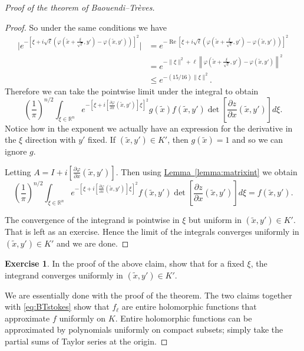 \documentclass[12pt,openany]{book}
\renewcommand{\Re}{\operatorname{Re}}
\newcommand{\snorm}[1]{\lVert {#1} \rVert}
\newcommand{\bbabs}[1]{\biggl\lvert {#1} \biggr\rvert}
\newcommand{\norm}[1]{\left\lVert {#1} \right\rVert}
\newcommand{\R}{{\mathbb{R}}}
\theoremstyle{plain}
\theoremstyle{remark}
\theoremstyle{definition}
\newenvironment{exbox}{%
    \def\FrameCommand{\vrule width 1pt \relax\hspace {10pt}}%
    \MakeFramed {\advance \hsize -\width \FrameRestore }%
}{%
    \endMakeFramed
}
\theoremstyle{exercise}
\newtheorem{exercise}{Exercise}[section]
\theoremstyle{example}
\newcommand{\lemmaref}[1]{\hyperref[#1]{Lemma~\ref*{#1}}}
\begin{document}
\begin{proof}[Proof of the theorem of Baouendi--Tr{\`e}ves]
\begin{proof}
So under the same conditions we have
\begin{equation*}
\begin{split}
\bbabs{e^{-{\left[\xi +
i\sqrt{\ell}\left(\varphi\left(\tilde{x}+\frac{\xi}{\sqrt{\ell}},y'\right) -
\varphi(\tilde{x},y')\right)\right]}^2}}
& =
e^{-\Re {\left[\xi +
i\sqrt{\ell}\left(\varphi\left(\tilde{x}+\frac{\xi}{\sqrt{\ell}},y'\right) -
\varphi(\tilde{x},y')\right)\right]}^2}
\\
& =
e^{-\snorm{\xi}^2 + \ell
\norm{\varphi\left(\tilde{x}+\frac{\xi}{\sqrt{\ell}},y'\right) -
\varphi(\tilde{x},y')}^2}
\\
& \leq
e^{-(15/16)\snorm{\xi}^2} .
\end{split}
\end{equation*}
Therefore we can take the pointwise limit under the integral to obtain 
\begin{equation*}
{\left(\frac{1}{\pi}\right)}^{n/2}
\int_{\xi \in \R^n}
e^{-{\left[\xi + i\left[ \frac{\partial \varphi}{\partial x}(\tilde{x},y') \right] \xi \right]}^2}
g(\tilde{x})
f(\tilde{x},y')
\det \left[\frac{\partial z}{\partial
x}(\tilde{x},y')\right] d\xi .
\end{equation*}
Notice how in the exponent we actually have an expression for the derivative
in the $\xi$ direction with $y'$ fixed.  If $(\tilde{x},y') \in K'$, then
$g(\tilde{x}) = 1$ and so we can ignore $g$.

Letting $A = I + i \left[ \frac{\partial \varphi}{\partial x}(\tilde{x},y')
\right]$.  Then using \lemmaref{lemma:matrixint} we obtain 
\begin{equation*}
{\left(\frac{1}{\pi}\right)}^{n/2}
\int_{\xi \in \R^n}
e^{-{\left[\xi + i\left[ \frac{\partial \varphi}{\partial x}(\tilde{x},y') \right] \xi \right]}^2}
f(\tilde{x},y')
\det \left[\frac{\partial z}{\partial
x}(\tilde{x},y')\right] d\xi  = f(\tilde{x},y') .
\end{equation*}

The convergence of the integrand is pointwise in $\xi$
but uniform in $(\tilde{x},y') \in K'$.  That is left as an exercise.
Hence the limit of the integrals converges uniformly in 
$(\tilde{x},y') \in K'$ and we are done.
\end{proof}

\begin{exbox}
\begin{exercise}
In the proof of the above claim,
show that for a fixed $\xi$, the integrand converges uniformly in
$(\tilde{x},y') \in K'$.
\end{exercise}
\end{exbox}

We are essentially done with the proof of the theorem.
The two claims together with \eqref{eq:BTstokes} show that $f_\ell$ are entire
holomorphic functions that approximate $f$ uniformly on $K$.  Entire holomorphic
functions can be approximated by polynomials uniformly on compact subsets;
simply take the partial sums of Taylor series at the origin.
\end{proof}
\end{document}
